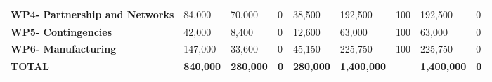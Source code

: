\begin{table}[H]
{\begin{tabular}{p{5cm}p{2cm}p{2cm}p{2.5cm}p{2cm}p{2cm}p{2cm}p{2cm}p{2cm}}
\textbf{WP4- Partnership and Networks} & 84,000                                                                 & 70,000                                                             &0                                                                                 & 38,500                                                                       & 192,500                                                                                       & 100                          & 192,500                         & 0                                                                         \\
\textbf{WP5- Contingencies}                                                        & 42,000                                                                 & 8,400                                                              &0                                                                                 & 12,600                                                                       & 63,000                                                                                        & 100                          & 63,000                          & 0                                                                         \\
\textbf{WP6- Manufacturing}                                                        & 147,000                                                                & 33,600                                                             &0                                                                                 & 45,150                                                                       & 225,750                                                                                       & 100                          & 225,750                         & 0                                                                         \\ \hline
\textbf{TOTAL}                                                                     & \textbf{840,000}                                                       & \textbf{280,000}                                                   & \textbf{0}                                                                      & \textbf{280,000}                                                             & \textbf{1,400,000}                                                                            & \textbf{}                    & \textbf{1,400,000}              & \textbf{0}                                                               
 \\ \bottomrule[2pt]
\end{tabular} }
\end{table}


